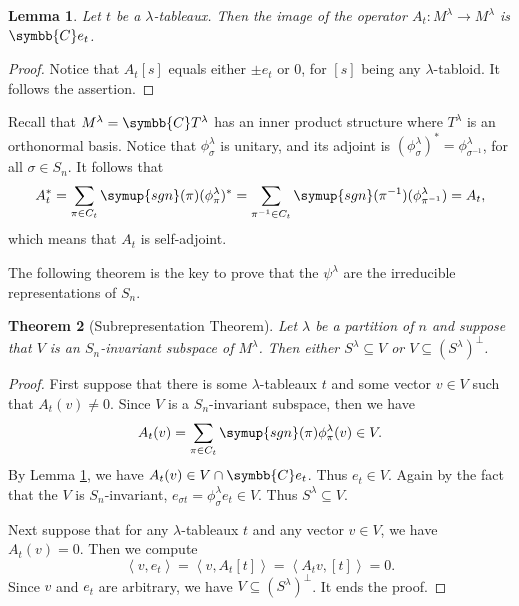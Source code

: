\documentclass{assignment}[2019/10/15]
\newcommand{\lr}[3]{\left#1#3\right#2}
\theoremstyle{plain}
\newtheorem{theorem}{Theorem}[section]
\newtheorem{lemma}[theorem]{Lemma}
\newcommand{\BC}{\symbb{C}}
\newcommand{\sgn}{\mathop{}\!\symup{sgn}}
\begin{document}
    \begin{lemma}\label{lem: At}
        Let $t$ be a $\lambda$-tableaux. Then the image of the operator $A_t\colon M^\lambda\to M^\lambda$ is $\BC e_t$.
    \end{lemma}
    \begin{proof}
        Notice that $A_t[s]$ equals either $\pm e_t$ or 0, for $[s]$ being any $\lambda$-tabloid. It follows the assertion.
    \end{proof}

    Recall that $M^\lambda = \BC T^\lambda$ has an inner product structure where $T^\lambda$ is an orthonormal basis. Notice that $\phi^\lambda_\sigma$ is unitary, and its adjoint is $(\phi^\lambda_\sigma)^*=\phi^\lambda_{\sigma^{-1}}$, for all $\sigma\in S_n$. It follows that
    \begin{equation}
        A_t^* = \sum_{\pi\in C_t}\sgn(\pi)(\phi^\lambda_\pi)^* = \sum_{\pi^{-1}\in C_t}\sgn(\pi^{-1})(\phi^\lambda_{\pi^{-1}}) = A_t,
    \end{equation}
    which means that $A_t$ is self-adjoint.

    The following theorem is the key to prove that the $\psi^\lambda$ are the irreducible representations of $S_n$.

    \begin{theorem}[Subrepresentation Theorem]\label{thm: subrepr}
        Let $\lambda$ be a partition of $n$ and suppose that $V$ is an $S_n$-invariant subspace of $M^\lambda$. Then either $S^\lambda\subseteq V$ or $V\subseteq (S^\lambda)^\perp$.
    \end{theorem}

    \begin{proof}
        First suppose that there is some $\lambda$-tableaux $t$ and some vector $v\in V$ such that $A_t(v)\neq 0$. Since $V$ is a $S_n$-invariant subspace, then we have
        \begin{equation}
            A_t(v)=\sum_{\pi\in C_t}\sgn(\pi)\phi_\pi^\lambda(v)\in V.
        \end{equation}
        By Lemma \ref{lem: At}, we have $A_t(v)\in V\cap \BC e_t$. Thus $e_t\in V$. Again by the fact that the $V$ is $S_n$-invariant, $e_{\sigma t} = \phi^\lambda_\sigma e_t\in V$. Thus $S^\lambda\subseteq V$.

        Next suppose that for any $\lambda$-tableaux $t$ and any vector $v\in V$, we have $A_t(v) = 0$. Then we compute
        \begin{equation}
            \lr<>{v, e_t} = \lr<>{v, A_t[t]} = \lr<>{A_tv, [t]} = 0.
        \end{equation}
        Since $v$ and $e_t$ are arbitrary, we have $V\subseteq (S^\lambda)^\perp$. It ends the proof.
    \end{proof}
\end{document}
